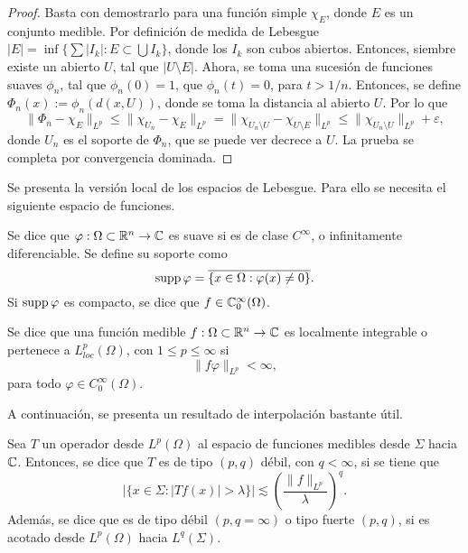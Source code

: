 \begin{proof}
	Basta con demostrarlo para una función simple $\chi_E$, donde $E$ es un conjunto medible. Por definición de medida de Lebesgue 
	$|E| = \inf\{\sum |I_k| : E \subset \bigcup I_k\}$, donde los $I_k$ son cubos abiertos. Entonces, siembre existe un abierto $U$, tal que $|U\setminus E|$. Ahora, se toma una sucesión de funciones suaves $\phi_n$, tal que $\phi_n(0)=1$, que $\phi_n(t)=0$, para $t>1/n$. Entonces, se define $\Phi_n(x) := \phi_n(d(x, U))$, donde se toma la distancia al abierto $U$. Por lo que 
	\begin{equation*}
		\|\Phi_n - \chi_E\|_{L^p} \leq \|\chi_{U_n} - \chi_E\|_{L^p} = \|\chi_{U_n\setminus U} - \chi_{U\setminus E}\|_{L^p} \leq \|\chi_{U_n\setminus U} \|_{L^p} +\varepsilon,
	\end{equation*}
	donde $U_n$ es el soporte de $\Phi_n$, que se puede ver decrece a $U$. La prueba se completa por convergencia dominada.
\end{proof}
Se presenta la versión local de los espacios de Lebesgue. Para ello se necesita el siguiente espacio de funciones.
\begin{definition}
		Se dice que $\varphi:\Omega\subset\mathbb{R}^n\rightarrow\mathbb{C}$ es suave si es de clase $C^\infty$, o infinitamente diferenciable.  Se define su soporte como 
		\begin{equation*}
			\operatorname{supp} \varphi = \overline{\{x\in\Omega:\varphi(x)\neq 0\}}.
		\end{equation*}
		Si $\operatorname{supp} \varphi$ es compacto, se dice que $f\in\mathbb{C}^\infty_0(\Omega)$.
\end{definition}
\begin{definition}
	Se dice que una función medible $f:\Omega\subset\mathbb{R}^n\rightarrow\mathbb{C}$ es localmente integrable o pertenece a $L^{p}_{loc}(\Omega)$, con $1\leq p\leq\infty$ si 
	\begin{equation*}
		\|f\varphi\|_{L^p} < \infty,
	\end{equation*} 
	para todo $\varphi\in C^\infty_0(\Omega)$.
\end{definition}
A continuación, se presenta un resultado de interpolación bastante útil. 
\begin{definition}
	Sea $T$ un operador desde $L^p(\Omega)$ al espacio de funciones medibles desde $\Sigma$ hacia $\mathbb{C}$. Entonces, se dice que $T$ es de tipo $(p,q)$ débil, con $q<\infty$, si se tiene que 
	\begin{equation*}
		|\{x\in\Sigma:|Tf(x)|>\lambda\}| \lesssim \left(\frac{\|f\|_{L^p}}{\lambda}\right)^q.
	\end{equation*}
	Además, se dice que es de tipo débil $(p, q=\infty)$ o tipo fuerte $(p, q)$, si es acotado desde $L^p(\Omega)$ hacia $L^q(\Sigma)$.
\end{definition}
